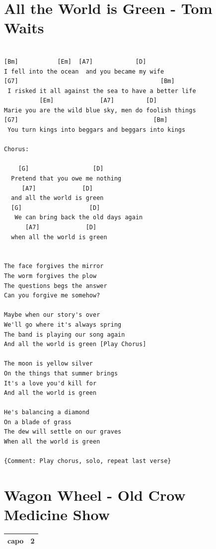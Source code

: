 \documentclass[
]{book}
\let\stdsection\section
\renewcommand\section{\clearpage\stdsection}
\begin{document}
\hypertarget{all-the-world-is-green---tom-waits}{%
\section{All the World is Green - Tom Waits}\label{all-the-world-is-green---tom-waits}}

\begin{verbatim}

[Bm]           [Em]  [A7]            [D]
I fell into the ocean  and you became my wife
[G7]                                        [Bm]
 I risked it all against the sea to have a better life
          [Em]             [A7]         [D]
Marie you are the wild blue sky, men do foolish things
[G7]                                      [Bm]
 You turn kings into beggars and beggars into kings

Chorus:
  
    [G]                  [D] 
  Pretend that you owe me nothing      
     [A7]             [D]
  and all the world is green
  [G]                   [D]        
   We can bring back the old days again     
      [A7]             [D]
  when all the world is green
  

The face forgives the mirror
The worm forgives the plow
The questions begs the answer
Can you forgive me somehow?

Maybe when our story's over
We'll go where it's always spring
The band is playing our song again
And all the world is green [Play Chorus]

The moon is yellow silver
On the things that summer brings
It's a love you'd kill for
And all the world is green

He's balancing a diamond
On a blade of grass
The dew will settle on our graves
When all the world is green

{Comment: Play chorus, solo, repeat last verse}
\end{verbatim}

\hypertarget{wagon-wheel---old-crow-medicine-show}{%
\section{Wagon Wheel - Old Crow Medicine Show}\label{wagon-wheel---old-crow-medicine-show}}

\begin{longtable}[]{@{}ll@{}}
\toprule
\endhead
capo & 2\tabularnewline
\bottomrule
\end{longtable}
\end{document}
